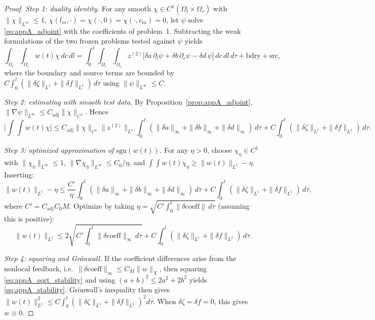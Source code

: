 \documentclass[pdflatex,sn-mathphys-num]{sn-jnl}%
\begin{document}
\begin{proof}
\emph{Step 1: duality identity.}
For any smooth \(\chi\in C^1(\overline{\Omega_l\times\Omega_c})\) with
\(\|\chi\|_{L^\infty}\le 1\), \(\chi(l_m,\cdot)=\chi(\cdot,0)=\chi(\cdot,c_m)=0\),
let \(\psi\) solve \eqref{eq:appA_adjoint} with the coefficients of problem~1.
Subtracting the weak formulations of the two frozen problems tested against \(\psi\)
yields
\begin{equation}\label{eq:appA_duality_identity}
\int_{\Omega_l}\!\int_{\Omega_c}w(t)\chi\,dc\,dl
=
\int_0^t\!\int_{\Omega_l}\!\int_{\Omega_c}
z^{(2)}\big[\delta a\,\partial_l\psi+\delta b\,\partial_c\psi-\delta d\,\psi\big]\,dc\,dl\,d\tau
+\text{bdry}+\text{src},
\end{equation}
where the boundary and source terms are bounded by
\(C\int_0^t(\|\delta\zeta\|_{L^1}+\|\delta f\|_{L^1})\,d\tau\) using
\(\|\psi\|_{L^\infty}\le C\).

\emph{Step 2: estimating with smooth test data.}
By Proposition~\ref{prop:appA_adjoint}, \(\|\nabla\psi\|_{L^\infty}\le C_{\mathrm{adj}}\|\chi\|_{C^1}\).
Hence
\[
\big|\textstyle\int\!\!\int w(t)\chi\big|
\le
C_{\mathrm{adj}}\|\chi\|_{C^1}\|z^{(2)}\|_{L^1}
\int_0^t(\|\delta a\|_\infty+\|\delta b\|_\infty+\|\delta d\|_\infty)\,d\tau
+C\int_0^t(\|\delta\zeta\|_{L^1}+\|\delta f\|_{L^1})\,d\tau.
\]

\emph{Step 3: optimized approximation of \(\mathrm{sgn}(w(t))\).}
For any \(\eta>0\), choose
\(\chi_\eta\in C^1\) with \(\|\chi_\eta\|_{L^\infty}\le 1\),
\(\|\nabla\chi_\eta\|_{L^\infty}\le C_0/\eta\), and
\(\int\!\!\int w(t)\chi_\eta\ge \|w(t)\|_{L^1}-\eta\).
Inserting:
\[
\|w(t)\|_{L^1}-\eta
\le
\frac{C'}{\eta}\int_0^t(\|\delta a\|_\infty+\|\delta b\|_\infty+\|\delta d\|_\infty)\,d\tau
+C\int_0^t(\|\delta\zeta\|_{L^1}+\|\delta f\|_{L^1})\,d\tau,
\]
where \(C'=C_{\mathrm{adj}}C_0 M\).
Optimize by taking \(\eta=\sqrt{C'\int_0^t\|\delta\mathrm{coeff}\|\,d\tau}\)
(assuming this is positive):
\begin{equation}\label{eq:appA_sqrt_stability}
\|w(t)\|_{L^1}
\le
2\sqrt{C'\int_0^t\|\delta\mathrm{coeff}\|_\infty\,d\tau}
+C\int_0^t(\|\delta\zeta\|_{L^1}+\|\delta f\|_{L^1})\,d\tau.
\end{equation}

\emph{Step 4: squaring and Gr\"onwall.}
If the coefficient differences arise from the nonlocal feedback, i.e.\
\(\|\delta\mathrm{coeff}\|_\infty\le C_M\|w\|_X\), then squaring
\eqref{eq:appA_sqrt_stability} and using \((a+b)^2\le 2a^2+2b^2\) yields
\eqref{eq:appA_stability}. Gr\"onwall's inequality then gives
\(\|w(t)\|_{L^1}^2\le C\int_0^t(\|\delta\zeta\|_{L^1}+\|\delta f\|_{L^1})^2d\tau\).
When \(\delta\zeta=\delta f=0\), this gives \(w\equiv 0\).
\end{proof}
\end{document}

